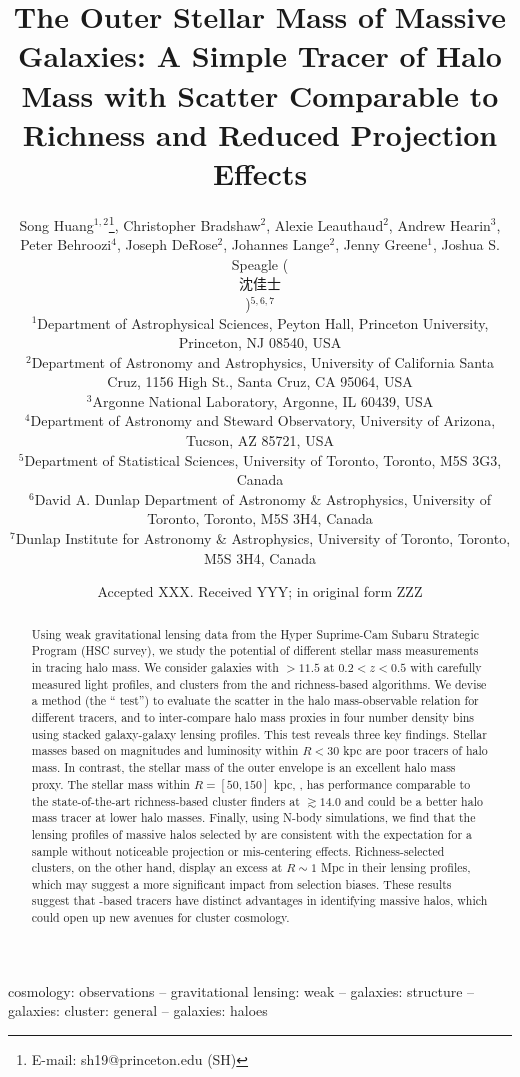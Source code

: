 \documentclass[fleqn,usenatbib,useAMS,english]{mnras}
\title[Outer Galaxy Mass as a Halo Mass Proxy]{
    The Outer Stellar Mass of Massive Galaxies: A Simple Tracer of Halo Mass with Scatter 
    Comparable to Richness and Reduced Projection Effects}
\author[S. Huang et al.]{
        Song Huang$^{1,2}$\thanks{E-mail: sh19@princeton.edu (SH)},
        Christopher Bradshaw$^{2}$,
        Alexie Leauthaud$^{2}$,
        Andrew Hearin$^{3}$,
        \newauthor
        Peter Behroozi$^{4}$,
        Joseph DeRose$^{2}$,
        Johannes Lange$^{2}$,
        Jenny Greene$^{1}$,
        Joshua S. Speagle (\begin{CJK*}{UTF8}{bsmi}沈佳士\ignorespacesafterend\end{CJK*})$^{5,6,7}$\\
        $^{1}$Department of Astrophysical Sciences, Peyton Hall,
              Princeton University, Princeton, NJ 08540, USA \\
        $^{2}$Department of Astronomy and Astrophysics, University of California
              Santa Cruz, 1156 High St., Santa Cruz, CA 95064, USA\\
        $^{3}$Argonne National Laboratory, Argonne, IL 60439, USA\\
        $^{4}$Department of Astronomy and Steward Observatory, University of Arizona,
              Tucson, AZ 85721, USA\\
        $^{5}$Department of Statistical Sciences, University of Toronto, Toronto, M5S 3G3, Canada\\
        $^{6}$David A. Dunlap Department of Astronomy \& Astrophysics, University of Toronto, Toronto, M5S 3H4, Canada\\
        $^{7}$Dunlap Institute for Astronomy \& Astrophysics, University of Toronto, Toronto, M5S 3H4, Canada
        }
\date{Accepted XXX. Received YYY; in original form ZZZ}
\begin{document}
\label{firstpage}
\pagerange{\pageref{firstpage}--\pageref{lastpage}}

\maketitle


\begin{abstract}
    
    Using weak gravitational lensing data from the Hyper Suprime-Cam Subaru Strategic Program
    (HSC survey), we study the potential of different stellar mass measurements in tracing halo
    mass.
    We consider galaxies with \logms{}$>11.5$ at $0.2 < z < 0.5$ with carefully measured light profiles,
    and clusters from the \redm{} and \camira{} richness-based algorithms.
    We devise a method (the ``\topn{} test'') to evaluate the scatter in the halo mass-observable
    relation for different tracers, and to inter-compare halo mass proxies in four number density bins using stacked
    galaxy-galaxy lensing profiles.
    This test reveals three key findings. Stellar masses based on \cmodel{} magnitudes and luminosity within
    $R<$30 kpc are poor tracers of halo mass. In contrast, the stellar mass of the outer envelope is an excellent halo
    mass proxy. The stellar mass within $R=[50,150]$ kpc,  , has performance comparable to the
    state-of-the-art richness-based cluster finders at \logmvir{}$\gtrsim 14.0$ and could be 
    a better halo mass tracer at lower halo masses. Finally, using N-body simulations, we find that the lensing profiles of massive halos selected
    by  are consistent with the
    expectation for a sample without noticeable projection or mis-centering effects. Richness-selected clusters, on the other hand, display an excess at $R\sim 1$ Mpc in their 
    lensing profiles, which may suggest a more significant impact from selection biases.
    These results suggest that \mstar{}-based tracers have distinct advantages in
    identifying massive halos, which could open up new avenues 
    for cluster cosmology.

\end{abstract}

\begin{keywords}
    cosmology: observations --
    gravitational lensing: weak --
    galaxies: structure --
    galaxies: cluster: general --
    galaxies: haloes
\end{keywords}
\end{document}
